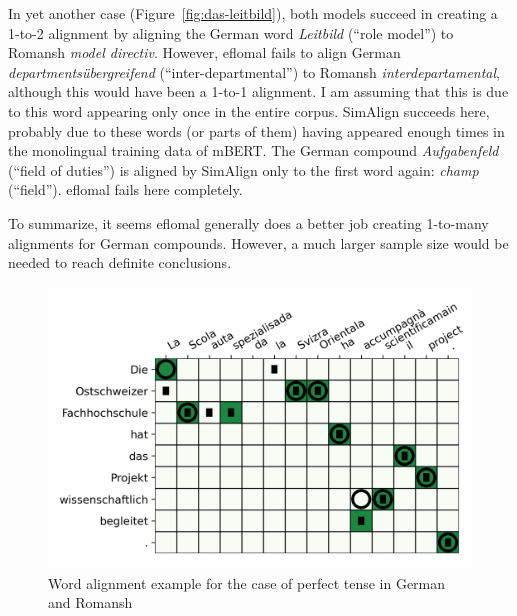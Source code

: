 In yet another case (Figure~\ref{fig:das-leitbild}), both models succeed in creating a 1-to-2 alignment by aligning the German word \emph{Leitbild} (\enquote{role model}) to Romansh \emph{model directiv}. 
However, eflomal fails to align German \emph{departmentsübergreifend} (\enquote{inter-departmental}) to Romansh \emph{interdepartamental}, although this would have been a 1-to-1 alignment. I am assuming that this is due to this word appearing only once in the entire corpus. 
SimAlign succeeds here, probably due to these words (or parts of them) having appeared enough times in the monolingual training data of mBERT. 
The German compound \emph{Aufgabenfeld} (\enquote{field of duties}) is aligned by SimAlign only to the first word again: \emph{champ} (\enquote{field}). 
eflomal fails here completely.


To summarize, it seems eflomal generally does a better job creating 1-to-many alignments for German compounds. 
However, a much larger sample size would be needed to reach definite conclusions.

\begin{figure}
	\includegraphics{graphics/alignments/example7-prefect2.png}
	\caption{Word alignment example for the case of perfect tense in German and Romansh}\label{fig:die-ostschwizer-fachhochschule}
\end{figure}



